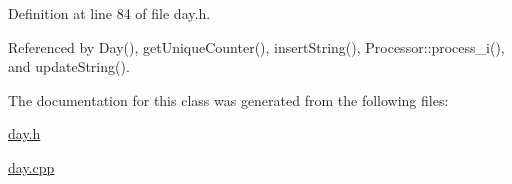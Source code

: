Definition at line 84 of file day.h.

Referenced by Day(), get\-Unique\-Counter(), insert\-String(), Processor::process\_\-i(), and update\-String().

The documentation for this class was generated from the following files:\begin{CompactItemize}
\item 
\hyperlink{day_8h}{day.h}\item 
\hyperlink{day_8cpp}{day.cpp}\end{CompactItemize}
